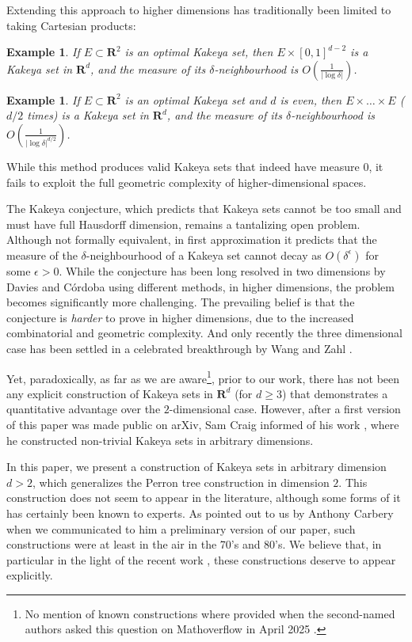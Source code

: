 \documentclass[10pt]{amsart}
\newcommand{\R}{\mathbf{R}}
\newtheorem{example}[theorem]{Example}
\begin{document}
Extending this approach to higher dimensions has traditionally been limited to taking Cartesian products:
\begin{example} If $E \subset \R^2$ is an optimal Kakeya set, then $E \times [0,1]^{d-2}$ is a Kakeya set in $\R^d$, and the measure of its $\delta$-neighbourhood is $O(\frac{1}{|\log \delta|})$.
\end{example}
\begin{example}
  If $E \subset \R^2$ is an optimal Kakeya set and $d$ is even, then $E\times\dots \times E$ ($d/2$ times) is a Kakeya set in $\R^d$, and the measure of its $\delta$-neighbourhood is $O(\frac{1}{|\log \delta|^{d/2}})$.
\end{example}
While this method produces valid Kakeya sets that indeed have measure $0$, it fails to exploit the full geometric complexity of higher-dimensional spaces.

The Kakeya conjecture, which predicts that Kakeya sets cannot be too
small and must have full Hausdorff dimension,
remains a tantalizing open problem. Although not formally equivalent,
in first approximation it predicts that the measure of the
$\delta$-neighbourhood of a Kakeya set cannot decay as $O(\delta^\epsilon)$
for some $\epsilon>0$. While the conjecture has been long resolved
in two dimensions by Davies and Córdoba \cite{RefWorks:davies1971remarks,RefWorks:cordoba1977kakeya} using different methods, in higher dimensions, the problem becomes
significantly more challenging. The prevailing belief is that the
conjecture is \emph{harder} to prove in higher dimensions, due to the
increased combinatorial and geometric complexity.  And only recently
the three dimensional case has been settled in a celebrated
breakthrough by Wang and Zahl \cite{RefWorks:wang2025volume}.

Yet, paradoxically, as far as we are aware\footnote{No mention of known constructions where provided when the second-named authors asked this question on Mathoverflow in April 2025 \cite{MOQuestion}.}, prior to our work, there has not been any explicit construction of Kakeya sets in  $\R^d$  (for  $d \geq 3$) that demonstrates a quantitative advantage over the $2$-dimensional case. However, after a first version of this paper was made public on arXiv, Sam Craig informed of his work \cite{CraigJGA}, where he constructed non-trivial Kakeya sets in arbitrary dimensions.

In this paper, we present a construction of Kakeya sets in arbitrary dimension $d > 2$, which generalizes the Perron tree construction in dimension $2$. This construction does not seem to appear in the literature, although some forms of it has certainly been known to experts. As pointed out to us by Anthony Carbery when we communicated to him a preliminary version of our paper, such constructions were at least in the air in the 70's and 80's. We believe that, in particular in the light of the recent work \cite{delasalle2026kakeyaconjecturehighranklattice}, these constructions deserve to appear explicitly. 
\end{document}

